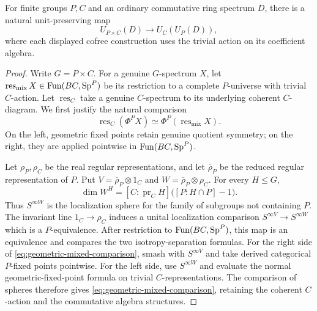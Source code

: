 \begin{lemma}\label{lem:product-comparison}
For finite groups \(P,C\) and an ordinary commutative ring spectrum
\(D\), there is a natural unit-preserving map
\[
 U_{P\times C}(D)\longrightarrow U_C(U_P(D)),
\]
where each displayed cofree construction uses the trivial action on
its coefficient algebra.
\end{lemma}
\begin{proof}
Write \(G=P\times C\). For a genuine \(G\)-spectrum \(X\), let
\(\operatorname{res}_{\mathrm{mix}}X\in\operatorname{Fun}(BC,\mathrm{Sp}^P)\) be its
restriction to a complete \(P\)-universe with trivial \(C\)-action.
Let \(\operatorname{res}_C\) take a genuine \(C\)-spectrum to its
underlying coherent \(C\)-diagram. We first justify the natural comparison
\begin{equation}\label{eq:geometric-mixed-comparison}
 \operatorname{res}_C(\Phi^P X)
   \simeq\Phi^P(\operatorname{res}_{\mathrm{mix}}X).
\end{equation}
On the left, geometric fixed points retain genuine quotient symmetry;
on the right, they are applied pointwise in \(\operatorname{Fun}(BC,\mathrm{Sp}^P)\).

Let \(\rho_P,\rho_C\) be the real regular representations, and let
\(\overline\rho_P\) be the reduced regular representation of \(P\).
Put \(V=\overline\rho_P\otimes1_C\) and
\(W=\overline\rho_P\otimes\rho_C\). For every \(H\le G\),
\[
 \dim W^H=[C:\operatorname{pr}_C H]\bigl([P:H\cap P]-1\bigr).
\]
Thus \(S^{\infty W}\) is the localization sphere for the family of
subgroups not containing \(P\). The invariant line
\(1_C\to\rho_C\) induces a unital localization comparison
\(S^{\infty V}\to S^{\infty W}\) which is a \(P\)-equivalence.
After restriction to \(\operatorname{Fun}(BC,\mathrm{Sp}^P)\), this map is an equivalence
and compares the two isotropy-separation formulas. For the right side of
\eqref{eq:geometric-mixed-comparison}, smash with \(S^{\infty V}\)
and take derived categorical \(P\)-fixed points pointwise. For the left
side, use \(S^{\infty W}\) and evaluate the normal geometric-fixed-point
formula on trivial \(C\)-representations. The comparison of spheres
therefore gives \eqref{eq:geometric-mixed-comparison}, retaining the
coherent \(C\)-action and the commutative algebra structures.


\end{proof}
